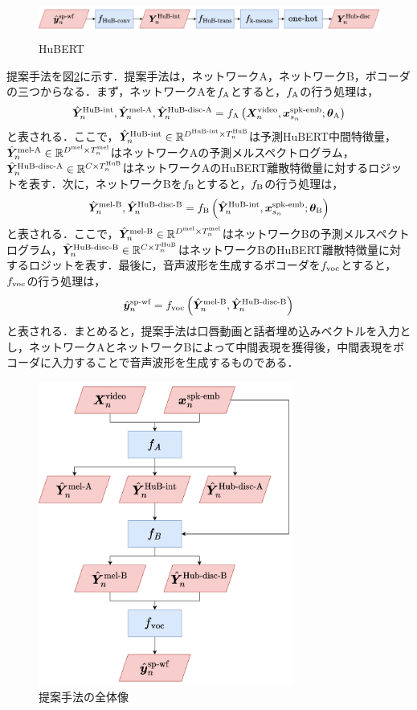 \begin{figure}[b]
    \centering
    \includegraphics[height=12mm]{./figure/sec4/model_2/hubert.drawio.png}
    \caption{HuBERT}
    \label{sec4:fig:hubert}
\end{figure}

提案手法を図\ref{sec4:fig:overview}に示す．提案手法は，ネットワークA，ネットワークB，ボコーダの三つからなる．まず，ネットワークAを$f_{\text{A}}$とすると，$f_{\text{A}}$の行う処理は，
\begin{equation}
    \label{sec4:eq:networkA_overview}
    \hat{\bm{Y}}^{\text{HuB-int}}_{n}, \hat{\bm{Y}}^{\text{mel-A}}_{n}, \hat{\bm{Y}}^{\text{HuB-disc-A}}_{n} = f_{\text{A}}\left(\bm{X}^{\text{video}}_{n}, \bm{x}^{\text{spk-emb}}_{s_{n}}; \bm{\theta}_{\text{A}}\right)
\end{equation}
と表される．ここで，$\hat{\bm{Y}}^{\text{HuB-int}}_{n} \in \mathbb{R}^{D^{\text{HuB-int}} \times T^{\text{HuB}}_{n}}$は予測HuBERT中間特徴量，$\hat{\bm{Y}}^{\text{mel-A}}_{n} \in \mathbb{R}^{D^{\text{mel}} \times T^{\text{mel}}_{n}}$はネットワークAの予測メルスペクトログラム，$\hat{\bm{Y}}^{\text{HuB-disc-A}}_{n} \in \mathbb{R}^{C \times T^{\text{HuB}}_{n}}$はネットワークAのHuBERT離散特徴量に対するロジットを表す．次に，ネットワークBを$f_{\text{B}}$とすると，$f_{\text{B}}$の行う処理は，
\begin{equation}
    \hat{\bm{Y}}^{\text{mel-B}}_{n}, \hat{\bm{Y}}^{\text{HuB-disc-B}}_{n} = f_{\text{B}}\left(\hat{\bm{Y}}^{\text{HuB-int}}_{n}, \bm{x}^{\text{spk-emb}}_{s_{n}}; \bm{\theta}_{\text{B}}\right)
\end{equation}
と表される．ここで，$\hat{\bm{Y}}^{\text{mel-B}}_{n} \in \mathbb{R}^{D^{\text{mel}} \times T^{\text{mel}}_{n}}$はネットワークBの予測メルスペクトログラム，$\hat{\bm{Y}}^{\text{HuB-disc-B}}_{n} \in \mathbb{R}^{C \times T^{\text{HuB}}_{n}}$はネットワークBのHuBERT離散特徴量に対するロジットを表す．最後に，音声波形を生成するボコーダを$f_{\text{voc}}$とすると，$f_{\text{voc}}$の行う処理は，
\begin{equation}
    \hat{\bm{y}}^{\text{sp-wf}}_{n} = f_{\text{voc}}\left(\hat{\bm{Y}}^{\text{mel-B}}_{n}, \hat{\bm{Y}}^{\text{HuB-disc-B}}_{n}\right)
\end{equation}
と表される．まとめると，提案手法は口唇動画と話者埋め込みベクトルを入力とし，ネットワークAとネットワークBによって中間表現を獲得後，中間表現をボコーダに入力することで音声波形を生成するものである．

\begin{figure}[bt]
    \centering
    \includegraphics[height=100mm]{./figure/sec4/model_2/overview.drawio.png}
    \caption{提案手法の全体像}
    \label{sec4:fig:overview}
\end{figure}

